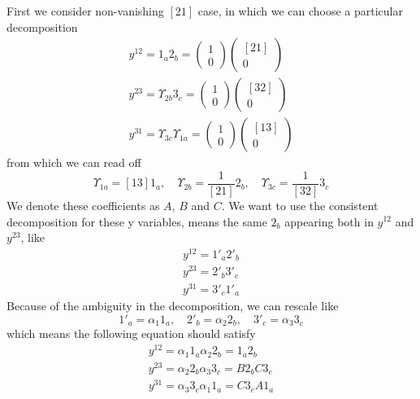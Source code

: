 \documentclass[12pt]{article}
\begin{document}
First we consider non-vanishing $[21]$ case, in which we can choose a particular decomposition 
\begin{gather}
    y^{12}=1_a2_b=\begin{pmatrix}
        1\\
        0
    \end{pmatrix}\begin{pmatrix}
        [21]\\
        0
    \end{pmatrix}\\
    y^{23}=\Upsilon_{2b}3_c=\begin{pmatrix}
        1\\
        0
    \end{pmatrix}\begin{pmatrix}
        [32]\\
        0
    \end{pmatrix}\\
    y^{31}=\Upsilon_{3c}\Upsilon_{1a}=\begin{pmatrix}
        1\\
        0
    \end{pmatrix}\begin{pmatrix}
        [13]\\
        0
    \end{pmatrix}
\end{gather}
from which we can read off
\begin{equation}
    \Upsilon_{1a}=[13]1_a,\quad \Upsilon_{2b}=\frac{1}{[21]}2_b,\quad \Upsilon_{3c}=\frac{1}{[32]}3_c
\end{equation}
We denote these coefficients as $A$, $B$ and $C$. We want to use the consistent decomposition for these y variables, means the same $2_b$ appearing both in $y^{12}$ and $y^{23}$, like 
\begin{gather}
    y^{12}=1'_a2'_b\\
    y^{23}=2'_b3'_c\\
    y^{31}=3'_c1'_a
\end{gather}
Because of the ambiguity in the decomposition, we can rescale like
\begin{equation}
    1'_a=\alpha_1 1_a,\quad 2'_b=\alpha_2 2_b,\quad 3'_c=\alpha_3 3_c
\end{equation}
which means the following equation should satisfy
\begin{gather}
    y^{12}=\alpha_1 1_a \alpha_2 2_b=1_a 2_b\\
    y^{23}=\alpha_2 2_b \alpha_3 3_c=B2_bC3_c\\
    y^{31}=\alpha_3 3_c \alpha_1 1_a=C3_c A1_a
\end{gather}
\end{document}

